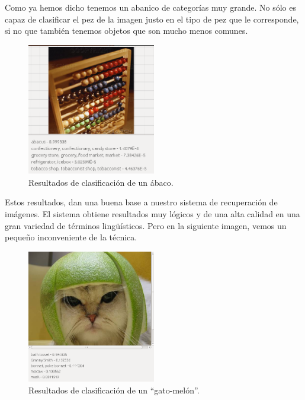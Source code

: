 Como ya hemos dicho tenemos un abanico de categorías muy grande. No sólo es capaz de clasificar el pez de la imagen justo en el tipo de pez que le corresponde, si no que también tenemos objetos que son mucho menos comunes.\\

\begin{figure}[H]
\begin{center}

\includegraphics[width=0.5\textwidth]{img/Abaco.png}
\end{center}

\caption{Resultados de clasificación de un ábaco.}
\end{figure}

Estos resultados, dan una buena base a nuestro sistema de recuperación de imágenes. El sistema obtiene resultados muy lógicos y de una alta calidad en una gran variedad de términos lingüísticos. Pero en la siguiente imagen, vemos un pequeño inconveniente de la técnica.\\

\begin{figure}[H]
\begin{center}

\includegraphics[width=0.5\textwidth]{img/Gatomelon.png}
\end{center}

\caption{Resultados de clasificación de un ``gato-melón''.}
\end{figure}

